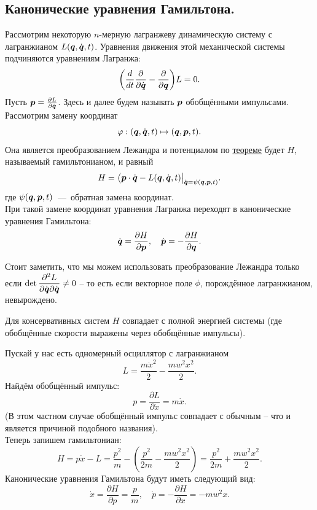 \subsection{Канонические уравнения Гамильтона.}
Рассмотрим некоторую $n$-мерную лагранжеву динамическую систему с лагранжианом $L(\boldsymbol{q}, \dot{\boldsymbol{q}}, t)$.
Уравнения движения этой механической системы подчиняются уравнениям Лагранжа:
\[
    \biggr(\dfrac{d}{dt}\dfrac{\partial}{\partial \dot{\boldsymbol{q}}} - \dfrac{\partial}{\partial \boldsymbol{q}}\biggr)L = 0.
\]
Пусть $\boldsymbol{p} = \frac{\partial L}{\partial \dot{\boldsymbol{q}}}$.
Здесь и далее будем называть $\boldsymbol{p}$ обобщёнными импульсами. \\
Рассмотрим замену координат
\[
    \varphi: (\boldsymbol{q}, \dot{\boldsymbol{q}}, t) \mapsto (\boldsymbol{q}, \boldsymbol{p}, t).
\]
Она является преобразованием Лежандра и потенциалом по \hyperref[th:1.1]{теореме} будет $H$, называемый гамильтонианом, и равный
\[
    H = \big\langle \boldsymbol{p} \cdot \dot{\boldsymbol{q}} - L(\boldsymbol{q}, \dot{\boldsymbol{q}}, t) \big|_{\dot{\boldsymbol{q}} = \psi(\boldsymbol{q}, \boldsymbol{p}, t)}.
\]
где $\psi(\boldsymbol{q}, \boldsymbol{p}, t)$~---~обратная замена координат. \\
При такой замене координат уравнения Лагранжа переходят в канонические уравнения Гамильтона:
\[
        \dot{\boldsymbol{q}} = \dfrac{\partial H}{\partial \boldsymbol{p}}, \quad
        \dot{\boldsymbol{p}} = -\dfrac{\partial H}{\partial \boldsymbol{q}}.
\]
\begin{note}
    Стоит заметить, что мы можем использовать преобразование Лежандра только если $\det \dfrac{\partial^2 L}{\partial \dot{\boldsymbol{q}} \partial \dot{\boldsymbol{q}}} \neq 0$ -- то есть если векторное поле $\phi$, порождённое лагранжианом, невырождено.
\end{note}
\begin{note}
    Для консервативных систем $H$ совпадает с полной энергией системы (где обобщённые скорости выражены через обобщённые импульсы).
\end{note}
\begin{example}
    Пускай у нас есть одномерный осциллятор с лагранжианом
    \[
        L = \dfrac{m \dot{x}^2}{2} - \dfrac{mw^2x^2}{2}.
    \]
    Найдём обобщённый импульс:
    \[
        p = \dfrac{\partial L}{\partial \dot{x}} = m \dot{x}.
    \]
    (В этом частном случае обобщённый импульс совпадает с обычным -- что и является причиной подобного названия). \\
    Теперь запишем гамильтониан:
    \[
        H = p\dot{x} - L = \dfrac{p^2}{m} - (\dfrac{p^2}{2m} - \dfrac{mw^2 x^2}{2}) = \dfrac{p^2}{2m} + \dfrac{mw^2 x^2}{2}.
    \]
    Канонические уравнения Гамильтона будут иметь следующий вид:
    \begin{equation*}
            \dot{x} = \dfrac{\partial H}{\partial p} = \dfrac{p}{m}, \quad
            \dot{p} = -\dfrac{\partial H}{\partial x} = - mw^2 x.
    \end{equation*}
\end{example}
